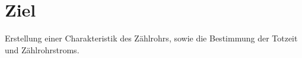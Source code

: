 \section{Ziel}
\label{sec:ziel}

Erstellung einer Charakteristik des Zählrohrs, sowie die Bestimmung der Totzeit und Zählrohrstroms.